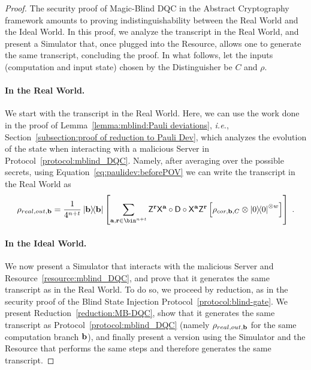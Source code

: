 \begin{proof}
    The security proof of Magic-Blind DQC in the Abstract Cryptography framework amounts to proving indistinguishability between the Real World and the Ideal World. In this proof, we analyze the transcript in the Real World, and present a Simulator that, once plugged into the Resource, allows one to generate the same transcript, concluding the proof. In what follows, let the inputs (computation and input state) chosen by the Distinguisher be $C$ and $\rho$.

    \paragraph{In the Real World.}
    We start with the transcript in the Real World. Here, we can use the work done in the proof of Lemma~\ref{lemma:mblind:Pauli deviations}, \textit{i.e.}, Section~\ref{subsection:proof of reduction to Pauli Dev}, which analyzes the evolution of the state when interacting with a malicious Server in Protocol~\ref{protocol:mblind_DQC}. Namely, after averaging over the possible secrets, using Equation~\ref{eq:paulidev:beforePOV} we can write the transcript in the Real World as
    \begin{equation}
        \rho_{real, out, \b}
        =
        \dfrac{1}{4^{n+t}}
            \ketbra\b
            \left[
                \sum_{\a, \r\in \bin^{n+t}}
                \Dec{\a}{\r}
                \circ
                \D
                \circ
                \Enc{\a}{\r}
                \left[
                    \rho_{cor, \b, C}
                \otimes
                \ketbra{0}^{\otimes w}
                \right]
            \right]\; .
    \end{equation}

    \paragraph{In the Ideal World.}
    We now present a Simulator that interacts with the malicious Server and Resource~\ref{resource:mblind_DQC}, and prove that it generates the same transcript as in the Real World. To do so, we proceed by reduction, as in the security proof of the Blind State Injection Protocol~\ref{protocol:blind-gate}. We present Reduction~\ref{reduction:MB-DQC}, show that it generates the same transcript as Protocol~\ref{protocol:mblind_DQC} (namely $\rho_{real, out, \mathbf b}$ for the same computation branch $\mathbf b$), and finally present a version using the Simulator and the Resource that performs the same steps and therefore generates the same transcript.


\end{proof}
